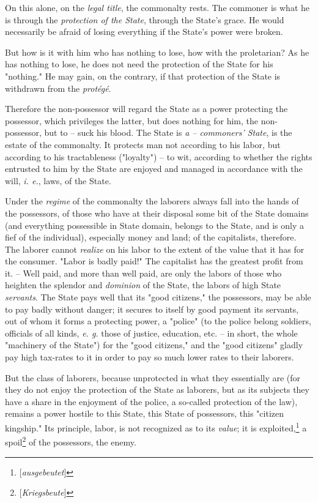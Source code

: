 \documentclass[a4paper]{book}
\begin{document}
On this alone, on the \textit{legal title}, the commonalty rests. The commoner 
is what he is through the \textit{protection of the State}, through the 
State's grace. He would necessarily be afraid of losing everything if the 
State's power were broken.

But how is it with him who has nothing to lose, how with the proletarian? As 
he has nothing to lose, he does not need the protection of the State for his 
"{}nothing."{} He may gain, on the contrary, if that protection of the State 
is withdrawn from the \textit{prot\'eg\'e}.

Therefore the non-possessor will regard the State as a power protecting the 
possessor, which privileges the latter, but does nothing for him, the 
non-possessor, but to -- suck his blood. The State is \textit{a -- commoners' 
State}, is the estate of the commonalty. It protects man not according to his 
labor, but according to his tractableness ("{}loyalty"{}) -- to wit, according 
to whether the rights entrusted to him by the State are enjoyed and managed in 
accordance with the will, \textit{i. e.}, laws, of the State.

Under the \textit{regime} of the commonalty the laborers always fall into the 
hands of the possessors, of those who have at their disposal some bit of the 
State domains (and everything possessible in State domain, belongs to the 
State, and is only a fief of the individual), especially money and land; of 
the capitalists, therefore. The laborer cannot \textit{realize} on his labor 
to the extent of the value that it has for the consumer. "{}Labor is badly 
paid!"{} The capitalist has the greatest profit from it. -- Well paid, and 
more than well paid, are only the labors of those who heighten the splendor 
and \textit{dominion} of the State, the labors of high State 
\textit{servants}. The State pays well that its "{}good citizens,"{} the 
possessors, may be able to pay badly without danger; it secures to itself by 
good payment its servants, out of whom it forms a protecting power, a 
"{}police"{} (to the police belong soldiers, officials of all kinds, 
\textit{e. g.} those of justice, education, etc. -- in short, the whole 
"{}machinery of the State"{}) for the "{}good citizens,"{} and the "{}good 
citizens"{} gladly pay high tax-rates to it in order to pay so much lower 
rates to their laborers.

But the class of laborers, because unprotected in what they essentially are 
(for they do not enjoy the protection of the State as laborers, but as its 
subjects they have a share in the enjoyment of the police, a so-called 
protection of the law), remains a power hostile to this State, this State of 
possessors, this "{}citizen kingship."{} Its principle, labor, is not 
recognized as to its \textit{value}; it is 
exploited,\footnote{[\textit{ausgebeutet}]} a 
spoil\footnote{[\textit{Kriegsbeute}]} of the possessors, the enemy.
\end{document}
